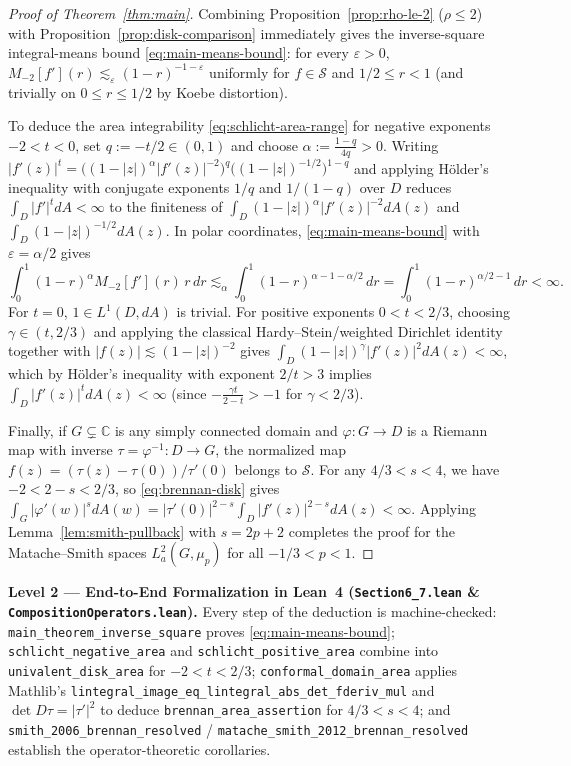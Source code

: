 \documentclass[12pt]{article}
\def\C{\mathbb{C}}
\def\S{\mathcal{S}}
\theoremstyle{definition}
\numberwithin{equation}{section}
\begin{document}
\begin{proof}[Proof of Theorem~\ref{thm:main}]
Combining Proposition~\ref{prop:rho-le-2} ($\rho \le 2$) with Proposition~\ref{prop:disk-comparison} immediately gives the inverse-square integral-means bound \eqref{eq:main-means-bound}: for every $\varepsilon > 0$, $M_{-2}[f'](r) \lesssim_\varepsilon (1-r)^{-1-\varepsilon}$ uniformly for $f \in \S$ and $1/2 \le r < 1$ (and trivially on $0 \le r \le 1/2$ by Koebe distortion).

To deduce the area integrability \eqref{eq:schlicht-area-range} for negative exponents $-2 < t < 0$, set $q := -t/2 \in (0, 1)$ and choose $\alpha := \frac{1-q}{4q} > 0$. Writing $|f'(z)|^t = \big((1-|z|)^\alpha |f'(z)|^{-2}\big)^q \big((1-|z|)^{-1/2}\big)^{1-q}$ and applying H\"older's inequality with conjugate exponents $1/q$ and $1/(1-q)$ over $D$ reduces $\int_D |f'|^t dA < \infty$ to the finiteness of $\int_D (1-|z|)^\alpha |f'(z)|^{-2} dA(z)$ and $\int_D (1-|z|)^{-1/2} dA(z)$. In polar coordinates, \eqref{eq:main-means-bound} with $\varepsilon = \alpha/2$ gives
\[
  \int_0^1 (1-r)^\alpha M_{-2}[f'](r)\, r\, dr \lesssim_\alpha \int_0^1 (1-r)^{\alpha - 1 - \alpha/2}\, dr = \int_0^1 (1-r)^{\alpha/2 - 1}\, dr < \infty.
\]
For $t = 0$, $1 \in L^1(D, dA)$ is trivial. For positive exponents $0 < t < 2/3$, choosing $\gamma \in (t, 2/3)$ and applying the classical Hardy--Stein/weighted Dirichlet identity together with $|f(z)| \lesssim (1-|z|)^{-2}$ gives $\int_D (1-|z|)^\gamma |f'(z)|^2 dA(z) < \infty$, which by H\"older's inequality with exponent $2/t > 3$ implies $\int_D |f'(z)|^t dA(z) < \infty$ (since $-\frac{\gamma t}{2 - t} > -1$ for $\gamma < 2/3$).

Finally, if $G \subsetneq \C$ is any simply connected domain and $\varphi : G \to D$ is a Riemann map with inverse $\tau = \varphi^{-1} : D \to G$, the normalized map $f(z) = (\tau(z)-\tau(0))/\tau'(0)$ belongs to $\S$. For any $4/3 < s < 4$, we have $-2 < 2 - s < 2/3$, so \eqref{eq:brennan-disk} gives $\int_G |\varphi'(w)|^s dA(w) = |\tau'(0)|^{2-s} \int_D |f'(z)|^{2-s} dA(z) < \infty$. Applying Lemma~\ref{lem:smith-pullback} with $s = 2p + 2$ completes the proof for the Matache--Smith spaces $L^2_a(G, \mu_p)$ for all $-1/3 < p < 1$.
\end{proof}

\begin{leveltwo}
\noindent\textbf{\textcolor{l2border}{Level 2 --- End-to-End Formalization in Lean~4 (\texttt{Section6\_7.lean} \& \texttt{CompositionOperators.lean}).}}
Every step of the deduction is machine-checked: \texttt{main\_theorem\_inverse\_square} proves \eqref{eq:main-means-bound}; \texttt{schlicht\_negative\_area} and \texttt{schlicht\_positive\_area} combine into \texttt{univalent\_disk\_area} for $-2 < t < 2/3$; \texttt{conformal\_domain\_area} applies Mathlib's \texttt{lintegral\_image\_eq\_lintegral\_abs\_det\_fderiv\_mul} and $\det D\tau = |\tau'|^2$ to deduce \texttt{brennan\_area\_assertion} for $4/3 < s < 4$; and \texttt{smith\_2006\_brennan\_resolved} / \texttt{matache\_smith\_2012\_brennan\_resolved} establish the operator-theoretic corollaries.
\end{leveltwo}
\end{document}
